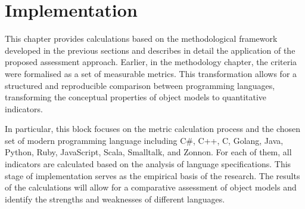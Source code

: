 \chapter{Implementation}
\label{chap:impl}

This chapter provides calculations based on the methodological framework developed in the previous sections and describes in detail the application of the proposed assessment approach. Earlier, in the methodology chapter, the criteria were formalised as a set of measurable metrics. This transformation allows for a structured and reproducible comparison between programming languages, transforming the conceptual properties of object models to quantitative indicators. 

In particular, this block focuses on the metric calculation process and the chosen set of modern programming language including C\#, C++, C, Golang, Java, Python, Ruby, JavaScript, Scala, Smalltalk, and Zonnon. For each of them, all indicators are calculated based on the analysis of language specifications. This stage of implementation serves as the empirical basis of the research. The results of the calculations will allow for a comparative assessment of object models and identify the strengths and weaknesses of different languages.
